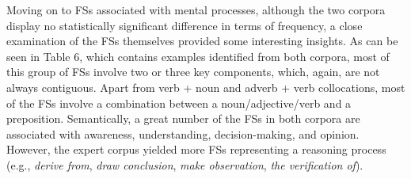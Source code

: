 \documentclass[12pt]{article}
\newenvironment{styleStandard}{\setlength\leftskip{0cm}\setlength\rightskip{0cm plus 1fil}\setlength\parindent{0cm}\setlength\parfillskip{0pt plus 1fil}\setlength\parskip{0cm plus 1pt}\writerlistparindent\writerlistleftskip\leavevmode\normalfont\normalsize\writerlistlabel\ignorespaces}{\unskip\vspace{0cm plus 1pt}\par}
\newcommand\writerlistleftskip{}
\newcommand\writerlistparindent{}
\newcommand\writerlistlabel{}
\begin{document}
\begin{styleStandard}
Moving on to FSs associated with mental processes, although the two corpora display no statistically significant difference in terms of frequency, a close examination of the FSs themselves provided some interesting insights. As can be seen in Table 6, which contains examples identified from both corpora, most of this group of FSs involve two or three key components, which, again, are not always contiguous. Apart from verb + noun and adverb + verb collocations, most of the FSs involve a combination between a noun/adjective/verb and a preposition. Semantically, a great number of the FSs in both corpora are associated with awareness, understanding, decision-making, and opinion. However, the expert corpus yielded more FSs representing a reasoning process (e.g., \textit{derive from}, \textit{draw conclusion}, \textit{make observation}, \textit{the verification of}).
\end{styleStandard}
\end{document}
